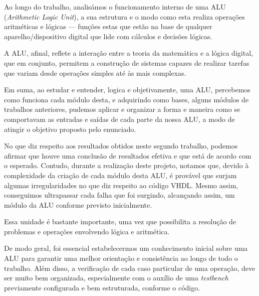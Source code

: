 

Ao longo do trabalho, analisámos o funcionamento interno de uma ALU (\textit{Arithmetic Logic Unit}), a sua estrutura e o modo como esta realiza operações aritméticas e lógicas — funções estas que estão na base de qualquer aparelho/dispositivo digital que lide com cálculos e decisões lógicas.

\vspace{5mm}

A ALU, afinal, reflete a interação entre a teoria da matemática e a lógica digital, que em conjunto, permitem a construção de sistemas capazes de realizar tarefas que variam desde operações simples até às mais complexas.

\vspace{5mm}

Em suma, ao estudar e entender, logica e objetivamente, uma ALU, percebemos como funciona cada módulo desta, e adquirindo como bases, alguns módulos de trabalhos anteriores, pudemos aplicar e organizar a forma e maneira como se comportavam as entradas e saídas de cada parte da nossa ALU, a modo de atingir o objetivo proposto pelo enunciado.




No que diz respeito aos resultados obtidos neste segundo trabalho, podemos afirmar que houve uma conclusão de resultados efetiva e que está de acordo com o esperado. Contudo, durante a realização deste projeto, notamos que, devido à complexidade da criação de cada módulo desta ALU, é provável que surjam algumas irregularidades no que diz respeito ao código VHDL. Mesmo assim, conseguimos ultrapassar cada falha que foi surgindo, alcançando assim, um módulo da ALU conforme previsto inicialmente.

\vspace{5mm}

Essa unidade é bastante importante, uma vez que possibilita a resolução de problemas e operações envolvendo lógica e aritmética.

\vspace{5mm}

De modo geral, foi essencial estabelecermos um conhecimento inicial sobre uma ALU para garantir uma melhor orientação e consistência ao longo de todo o trabalho. Além disso, a verificação de cada caso particular de uma operação, deve ser muito bem organizada, especialmente com o auxílio de uma \textit{testbench} previamente configurada e bem estruturada, conforme o código.



